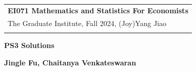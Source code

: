 \documentclass[a4paper,12pt]{article}\usepackage[]{graphicx}\usepackage[]{xcolor}
\begin{document}
\thispagestyle{empty} %

\begin{tabular}{p{15.5cm}} %
{\large \bf EI071 Mathematics and Statistics For Economists} \\
The Graduate Institute, Fall 2024, (Joy)Yang Jiao\\
\hline %
\\
\end{tabular} %

\vspace*{0.3cm} %

\begin{center} %
	{\Large \bf PS3 Solutions} %
	\vspace{2mm}
	
	{\bf Jingle Fu, Chaitanya Venkateswaran} %
		
\end{center}  

\vspace{0.4cm}
\end{document}
